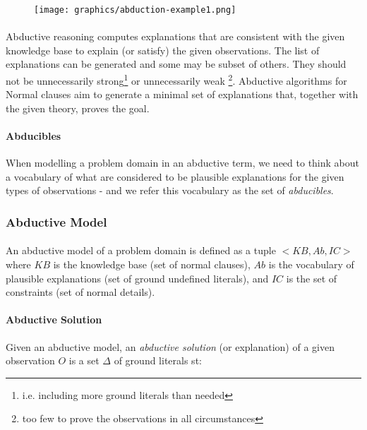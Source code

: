 \documentclass{article}
\theoremstyle{plain}
\theoremstyle{definition}
\begin{document}
\begin{multicols}{2}
\begin{figure}[H]
\centering
\texttt{[image: graphics/abduction-example1.png]}
\caption{}
\label{fig:abduction-example1}
\end{figure}

\paragraph{} Abductive reasoning computes explanations that are consistent with the given knowledge base to explain (or satisfy) the given observations. The list of explanations can be generated and some may be subset of others. They should not be unnecessarily strong\footnote{i.e. including more ground literals than needed} or unnecessarily weak \footnote{too few to prove the observations in all circumstances}. Abductive algorithms for Normal clauses aim to generate a minimal set of explanations that, together with the given theory, proves the goal.

\paragraph{Abducibles} When modelling a problem domain in an abductive term, we need to think about a vocabulary of what are considered to be plausible explanations for the given types of observations - and we refer this vocabulary as the set of \textit{abducibles}.

\subsubsection{Abductive Model}

\paragraph{} An abductive model of a problem domain is defined as a tuple $<KB, Ab, IC>$ where $KB$ is the knowledge base (set of normal clauses), $Ab$ is the vocabulary of plausible explanations (set of ground undefined literals), and $IC$ is the set of constraints (set of normal details).

\paragraph{Abductive Solution} Given an abductive model, an \textit{abductive solution} (or explanation) of a given observation $O$ is a set $\Delta$ of ground literals st:


\end{multicols}
\end{document}
